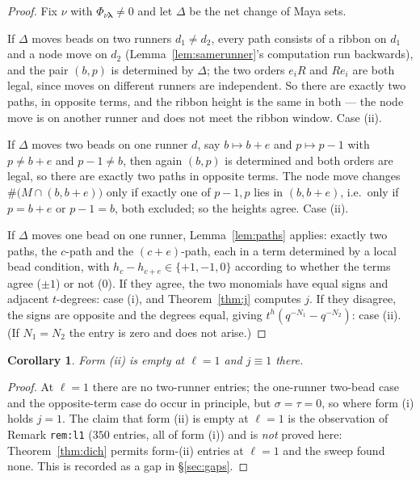 \documentclass[11pt]{article}
\newtheorem{corollary}[theorem]{Corollary}
\theoremstyle{definition}
\theoremstyle{remark}
\newcommand{\bl}{\boldsymbol{\lambda}}
\begin{document}
\begin{proof}
Fix $\nu$ with $\Phi_{\nu\bl}\ne0$ and let $\Delta$ be the net change of Maya sets.

If $\Delta$ moves beads on two runners $d_1\ne d_2$, every path consists of a ribbon on
$d_1$ and a node move on $d_2$ (Lemma~\ref{lem:samerunner}'s computation run backwards),
and the pair $(b,p)$ is determined by $\Delta$; the two orders $e_iR$ and $Re_i$ are both
legal, since moves on different runners are independent. So there are exactly two paths,
in opposite terms, and the ribbon height is the same in both --- the node move is on
another runner and does not meet the ribbon window. Case (ii).

If $\Delta$ moves two beads on one runner $d$, say $b\mapsto b+e$ and $p\mapsto p-1$ with
$p\ne b+e$ and $p-1\ne b$, then again $(b,p)$ is determined and both orders are legal, so
there are exactly two paths in opposite terms. The node move changes
$\#\big(M\cap(b,b+e)\big)$ only if exactly one of $p-1,p$ lies in $(b,b+e)$, i.e.\ only if
$p=b+e$ or $p-1=b$, both excluded; so the heights agree. Case (ii).

If $\Delta$ moves one bead on one runner, Lemma~\ref{lem:paths} applies: exactly two
paths, the $c$-path and the $(c+e)$-path, each in a term determined by a local bead
condition, with $h_c-h_{c+e}\in\{+1,-1,0\}$ according to whether the terms agree
($\pm1$) or not ($0$). If they agree, the two monomials have equal signs and adjacent
$t$-degrees: case (i), and Theorem~\ref{thm:j} computes $j$. If they disagree, the signs
are opposite and the degrees equal, giving $t^{h}(q^{-N_1}-q^{-N_2})$: case (ii). (If
$N_1=N_2$ the entry is zero and does not arise.)
\end{proof}

\begin{corollary}
Form (ii) is empty at $\ell=1$ and $j\equiv1$ there.
\end{corollary}
\begin{proof}
At $\ell=1$ there are no two-runner entries; the one-runner two-bead case and the
opposite-term case do occur in principle, but $\sigma=\tau=0$, so where form (i) holds
$j=1$. The claim that form (ii) is empty at $\ell=1$ is the observation of
Remark \texttt{rem:l1} ($350$ entries, all of form (i)) and is \emph{not} proved here:
Theorem~\ref{thm:dich} permits form-(ii) entries at $\ell=1$ and the sweep found none.
This is recorded as a gap in \S\ref{sec:gaps}.
\end{proof}
\end{document}
